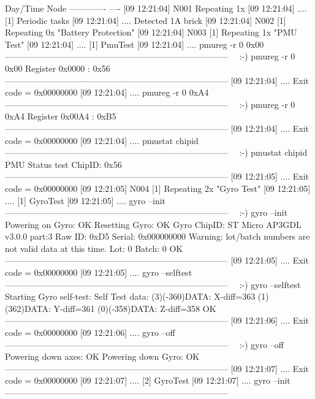\begin{AnnotedLogFile}
Day/Time      Node
------------- ----
[09 12:21:04] N001 Repeating 1x
[09 12:21:04] .... 	[1] Periodic tasks
[09 12:21:04] .... 		Detected 1A brick
[09 12:21:04] N002 	[1] Repeating 0x "Battery Protection"
[09 12:21:04] N003 	[1] Repeating 1x "PMU Test"
[09 12:21:04] .... 		[1] PmuTest
[09 12:21:04] .... 			pmureg -r 0 0x00
------------------------------------------------------------------------------
~~:-) pmureg -r 0 0x00
Register 0x0000 : 0x56
------------------------------------------------------------------------------
[09 12:21:04] .... 			Exit code = 0x00000000
[09 12:21:04] .... 			pmureg -r 0 0xA4
------------------------------------------------------------------------------
~~:-) pmureg -r 0 0xA4
Register 0x00A4 : 0xB5
------------------------------------------------------------------------------
[09 12:21:04] .... 			Exit code = 0x00000000
[09 12:21:04] .... 			pmustat chipid
------------------------------------------------------------------------------
~~:-) pmustat chipid
PMU Status test
ChipID: 0x56
------------------------------------------------------------------------------
[09 12:21:05] .... 			Exit code = 0x00000000
[09 12:21:05] N004 	[1] Repeating 2x "Gyro Test"
[09 12:21:05] .... 		[1] GyroTest
[09 12:21:05] .... 			gyro --init
------------------------------------------------------------------------------
~~:-) gyro --init
Powering on Gyro: OK
Resetting Gyro: OK
Gyro ChipID: ST Micro AP3GDL v3.0.0 part:3
Raw ID: 0xD5
Serial: 0x000000000
Warning: lot/batch numbers are not valid data at this time.
Lot: 0 Batch: 0
OK
------------------------------------------------------------------------------
[09 12:21:05] .... 			Exit code = 0x00000000
[09 12:21:05] .... 			gyro --selftest
------------------------------------------------------------------------------
~~:-) gyro --selftest
Starting Gyro self-test:
Self Test data:
(3)(-360)DATA: X-diff=363
(1)(362)DATA: Y-diff=361
(0)(-358)DATA: Z-diff=358
OK
------------------------------------------------------------------------------
[09 12:21:06] .... 			Exit code = 0x00000000
[09 12:21:06] .... 			gyro --off
------------------------------------------------------------------------------
~~:-) gyro --off
Powering down axes: OK
Powering down Gyro: OK
------------------------------------------------------------------------------
[09 12:21:07] .... 			Exit code = 0x00000000
[09 12:21:07] .... 		[2] GyroTest
[09 12:21:07] .... 			gyro --init
------------------------------------------------------------------------------

\end{AnnotedLogFile}
